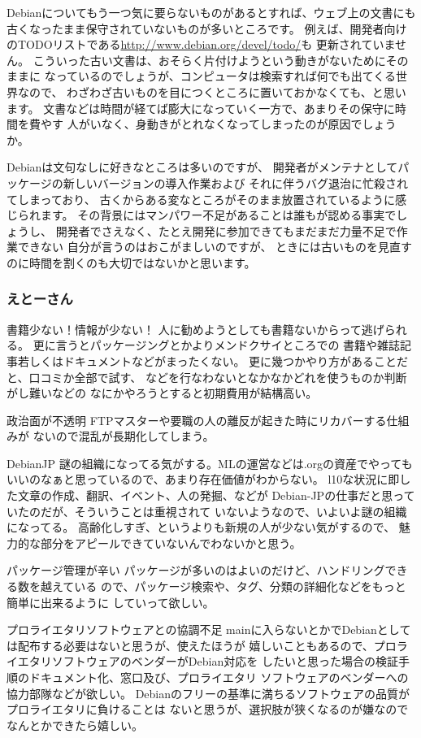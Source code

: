 \documentclass[mingoth]{jsarticle}
\begin{document}
Debianについてもう一つ気に要らないものがあるとすれば、ウェブ上の文書にも
古くなったまま保守されていないものが多いところです。
例えば、開発者向けのTODOリストである\url{http://www.debian.org/devel/todo/}も
更新されていません。
こういった古い文書は、おそらく片付けようという動きがないためにそのままに
なっているのでしょうが、コンピュータは検索すれば何でも出てくる世界なので、
わざわざ古いものを目につくところに置いておかなくても、と思います。
文書などは時間が経てば膨大になっていく一方で、あまりその保守に時間を費やす
人がいなく、身動きがとれなくなってしまったのが原因でしょうか。

Debianは文句なしに好きなところは多いのですが、
開発者がメンテナとしてパッケージの新しいバージョンの導入作業および
それに伴うバグ退治に忙殺されてしまっており、
古くからある変なところがそのまま放置されているように感じられます。
その背景にはマンパワー不足があることは誰もが認める事実でしょうし、
開発者でさえなく、たとえ開発に参加できてもまだまだ力量不足で作業できない
自分が言うのはおこがましいのですが、
ときには古いものを見直すのに時間を割くのも大切ではないかと思います。

\subsubsection{えとーさん}

書籍少ない！情報が少ない！
人に勧めようとしても書籍ないからって逃げられる。
更に言うとパッケージングとかよりメンドクサイところでの
書籍や雑誌記事若しくはドキュメントなどがまったくない。
更に幾つかやり方があることだと、口コミか全部で試す、
などを行なわないとなかなかどれを使うものか判断がし難いなどの
なにかやろうとすると初期費用が結構高い。

政治面が不透明
FTPマスターや要職の人の離反が起きた時にリカバーする仕組みが
ないので混乱が長期化してしまう。

DebianJP
謎の組織になってる気がする。MLの運営などは.orgの資産でやっても
いいのなぁと思っているので、あまり存在価値がわからない。
l10な状況に即した文章の作成、翻訳、イベント、人の発掘、などが
Debian-JPの仕事だと思っていたのだが、そういうことは重視されて
いないようなので、いよいよ謎の組織になってる。
高齢化しすぎ、というよりも新規の人が少ない気がするので、
魅力的な部分をアピールできていないんでわないかと思う。

パッケージ管理が辛い
パッケージが多いのはよいのだけど、ハンドリングできる数を越えている
ので、パッケージ検索や、タグ、分類の詳細化などをもっと簡単に出来るように
していって欲しい。

プロライエタリソフトウェアとの協調不足
mainに入らないとかでDebianとしては配布する必要はないと思うが、使えたほうが
嬉しいこともあるので、プロライエタリソフトウェアのベンダーがDebian対応を
したいと思った場合の検証手順のドキュメント化、窓口及び、プロライエタリ
ソフトウェアのベンダーへの協力部隊などが欲しい。
Debianのフリーの基準に満ちるソフトウェアの品質がプロライエタリに負けることは
ないと思うが、選択肢が狭くなるのが嫌なのでなんとかできたら嬉しい。
\end{document}
